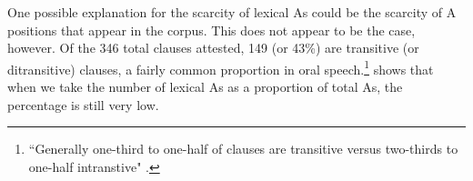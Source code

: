 \begin{table}

\caption{{A cross-linguistic comparison of lexical arguments in core grammatical roles}} 
\label{crossgeneraldist}

\end{table}


One possible explanation for the scarcity of lexical As could be the scarcity of A positions that appear in the corpus. This does not appear to be the case, however. Of the 346 total clauses attested, 149 (or 43{\%}) are transitive (or ditransitive) clauses, a fairly common proportion in oral speech.\footnote{``Generally one-third to one-half of clauses are transitive versus two-thirds to one-half intranstive"  \citep[63-64]{dubois2003a}.}  shows that when we take the number of lexical As as a proportion of total As, the percentage is still very low.

